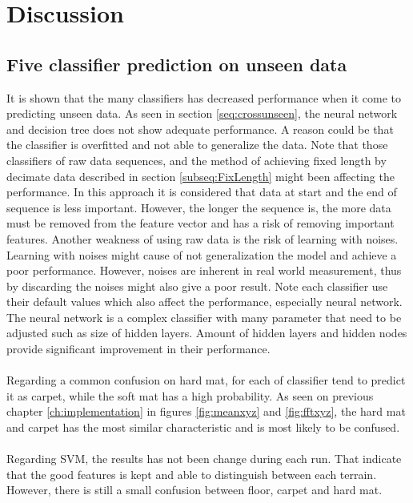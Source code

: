 \documentclass[USenglish]{ifimaster}  %
\begin{document}
\chapter{Discussion}
	
\section{Five classifier prediction on unseen data}
It is shown that the many classifiers has decreased performance when it come to predicting unseen data. As seen in section \ref{seq:crossunseen}, the neural network and decision tree does not show adequate performance. A reason could be that the classifier is overfitted and not able to generalize the data. Note that those classifiers of raw data sequences, and the method of achieving fixed length by decimate data described in section \ref{subseq:FixLength} might been affecting the performance. In this approach it is considered that data at start and the end of sequence is less important. However, the longer the sequence is, the more data must be removed from the feature vector and has a risk of removing important features. Another weakness of using raw data is the risk of learning with noises. Learning with noises might cause of not generalization the model and achieve a poor performance. However, noises are inherent in real world measurement, thus by discarding the noises might also give a poor result. Note each classifier use their default values which also affect the performance, especially neural network. The neural network is a complex classifier with many parameter that need to be adjusted such as size of hidden layers. Amount of hidden layers and hidden nodes provide significant improvement in their performance.  
\\
\\
Regarding a common confusion on hard mat, for each of classifier tend to predict it as carpet, while the soft mat has a high probability. As seen on previous chapter \ref{ch:implementation} in figures \ref{fig:meanxyz} and \ref{fig:fftxyz}, the hard mat and carpet has the most similar characteristic and is most likely to be confused.
\\
\\
Regarding SVM, the results has not been change during each run. That indicate that the good features is kept and able to distinguish between each terrain. However, there is still a small confusion between floor, carpet and hard mat. 
	
	
\end{document}
